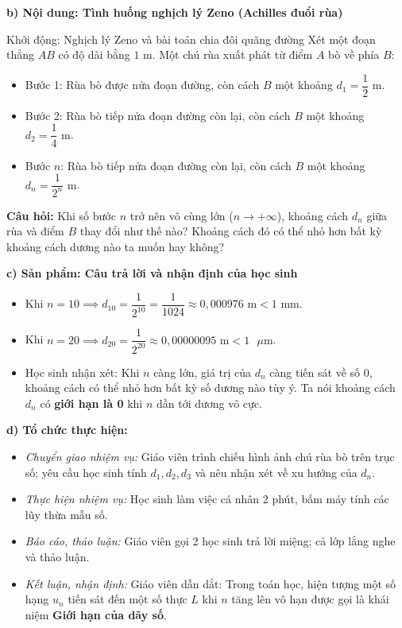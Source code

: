 \documentclass[12pt, a4paper]{article}
\begin{document}
\noindent \textbf{b) Nội dung: Tình huống nghịch lý Zeno (Achilles đuổi rùa)}
\begin{pedabox}{Khởi động: Nghịch lý Zeno và bài toán chia đôi quãng đường}
Xét một đoạn thẳng $AB$ có độ dài bằng $1\text{ m}$. Một chú rùa xuất phát từ điểm $A$ bò về phía $B$:
\begin{itemize}[leftmargin=0.6cm]
    \item Bước 1: Rùa bò được nửa đoạn đường, còn cách $B$ một khoảng $d_1 = \dfrac{1}{2}\text{ m}$.
    \item Bước 2: Rùa bò tiếp nửa đoạn đường còn lại, còn cách $B$ một khoảng $d_2 = \dfrac{1}{4}\text{ m}$.
    \item Bước $n$: Rùa bò tiếp nửa đoạn đường còn lại, còn cách $B$ một khoảng $d_n = \dfrac{1}{2^n}\text{ m}$.
\end{itemize}
\textbf{Câu hỏi:} Khi số bước $n$ trở nên vô cùng lớn ($n \to +\infty$), khoảng cách $d_n$ giữa rùa và điểm $B$ thay đổi như thế nào? Khoảng cách đó có thể nhỏ hơn bất kỳ khoảng cách dương nào ta muốn hay không?
\end{pedabox}

\noindent \textbf{c) Sản phẩm: Câu trả lời và nhận định của học sinh}
\begin{itemize}[leftmargin=0.6cm]
    \item Khi $n = 10 \implies d_{10} = \dfrac{1}{2^{10}} = \dfrac{1}{1024} \approx 0{,}000976\text{ m} < 1\text{ mm}$.
    \item Khi $n = 20 \implies d_{20} = \dfrac{1}{2^{20}} \approx 0{,}00000095\text{ m} < 1\text{ }\mu\text{m}$.
    \item Học sinh nhận xét: Khi $n$ càng lớn, giá trị của $d_n$ càng tiến sát về số $0$, khoảng cách có thể nhỏ hơn bất kỳ số dương nào tùy ý. Ta nói khoảng cách $d_n$ có \textbf{giới hạn là 0} khi $n$ dần tới dương vô cực.
\end{itemize}

\noindent \textbf{d) Tổ chức thực hiện:}
\begin{itemize}[leftmargin=0.8cm]
    \item \textit{Chuyển giao nhiệm vụ:} Giáo viên trình chiếu hình ảnh chú rùa bò trên trục số; yêu cầu học sinh tính $d_1, d_2, d_3$ và nêu nhận xét về xu hướng của $d_n$.
    \item \textit{Thực hiện nhiệm vụ:} Học sinh làm việc cá nhân 2 phút, bấm máy tính các lũy thừa mẫu số.
    \item \textit{Báo cáo, thảo luận:} Giáo viên gọi 2 học sinh trả lời miệng; cả lớp lắng nghe và thảo luận.
    \item \textit{Kết luận, nhận định:} Giáo viên dẫn dắt: Trong toán học, hiện tượng một số hạng $u_n$ tiến sát đến một số thực $L$ khi $n$ tăng lên vô hạn được gọi là khái niệm \textbf{Giới hạn của dãy số}.
\end{itemize}
\end{document}
